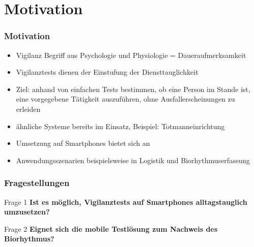 \section{Motivation}

\begin{frame}
 \frametitle{Motivation}
	 \begin{itemize}[<+->]
	 \item Vigilanz Begriff aus Psychologie und Physiologie = Daueraufmerksamkeit
	 \item Vigilanztests dienen der Einstufung der Diensttauglichkeit
	 \item Ziel: anhand von einfachen Tests bestimmen, ob eine Person im Stande ist, eine vorgegebene Tätigkeit auszuführen, ohne Ausfallerscheinungen zu erleiden
	 \item ähnliche Systeme bereits im Einsatz, Beispiel: Totmanneinrichtung
	 \item Umsetzung auf Smartphones bietet sich an
	 \item Anwendungsszenarien beispielsweise in Logistik und Biorhythmuserfassung
	 \end{itemize}
\end{frame}
\begin{frame}
\frametitle{Fragestellungen}
\pause
	\begin{block}{Frage 1}
	\textbf{Ist es möglich, Vigilanztests auf Smartphones alltagstauglich umzusetzen?}
	\end{block}
	\pause
	\begin{block}{Frage 2}
		\textbf{Eignet sich die mobile Testlösung zum Nachweis des Biorhythmus?}
	\end{block}
\end{frame}